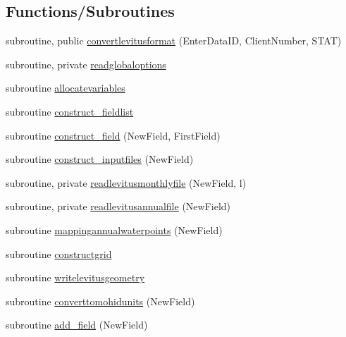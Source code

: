 \subsection*{Functions/\+Subroutines}
\begin{DoxyCompactItemize}
\item 
subroutine, public \mbox{\hyperlink{namespacemodulelevitusformat_a7849fb124c87ab2b4867b47c45ae92db}{convertlevitusformat}} (Enter\+Data\+ID, Client\+Number, S\+T\+AT)
\item 
subroutine, private \mbox{\hyperlink{namespacemodulelevitusformat_a3776b26027a1df5b06714f551024abed}{readglobaloptions}}
\item 
subroutine \mbox{\hyperlink{namespacemodulelevitusformat_a1666412a426a4d69b36a48bbb07feb9e}{allocatevariables}}
\item 
subroutine \mbox{\hyperlink{namespacemodulelevitusformat_a283a6fb7f680ba1855b1e20b95906146}{construct\+\_\+fieldlist}}
\item 
subroutine \mbox{\hyperlink{namespacemodulelevitusformat_a1dfa75e5e2a006d4bcbca7bbb3e74ced}{construct\+\_\+field}} (New\+Field, First\+Field)
\item 
subroutine \mbox{\hyperlink{namespacemodulelevitusformat_a3771e94f5b1b7829553eba0cea20546a}{construct\+\_\+inputfiles}} (New\+Field)
\item 
subroutine, private \mbox{\hyperlink{namespacemodulelevitusformat_abe175ce441457a68d1d3d191baa3732a}{readlevitusmonthlyfile}} (New\+Field, l)
\item 
subroutine, private \mbox{\hyperlink{namespacemodulelevitusformat_aefc320bae22e2d949151376118a03ce4}{readlevitusannualfile}} (New\+Field)
\item 
subroutine \mbox{\hyperlink{namespacemodulelevitusformat_aeaf32cef0849c2f2d279062a6a41696a}{mappingannualwaterpoints}} (New\+Field)
\item 
subroutine \mbox{\hyperlink{namespacemodulelevitusformat_a8d2f6c0620be1ea52eadbd9f59b02100}{constructgrid}}
\item 
subroutine \mbox{\hyperlink{namespacemodulelevitusformat_a6b331414c3615b8cf034262b51b17a6b}{writelevitusgeometry}}
\item 
subroutine \mbox{\hyperlink{namespacemodulelevitusformat_a9df551d282255b0ecad476a5078996da}{converttomohidunits}} (New\+Field)
\item 
subroutine \mbox{\hyperlink{namespacemodulelevitusformat_a8b8115698d0550d00e51cdfacfac4849}{add\+\_\+field}} (New\+Field)
\item 

\end{DoxyCompactItemize}
